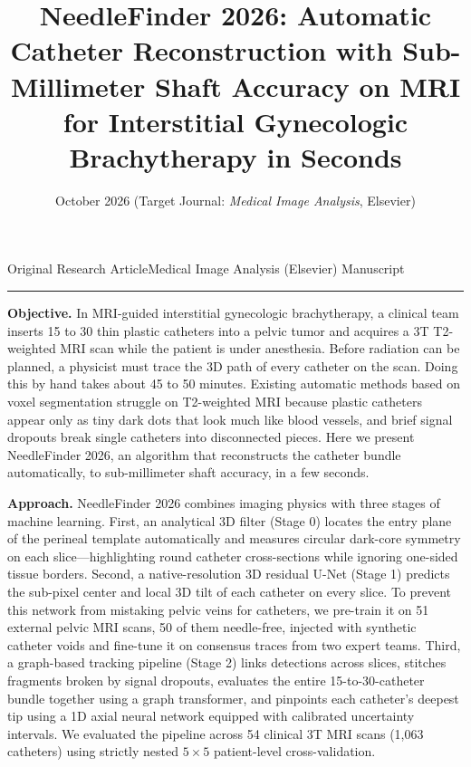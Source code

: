 \documentclass[
  11pt,
]{article}
\title{NeedleFinder 2026: Automatic Catheter Reconstruction with
Sub-Millimeter Shaft Accuracy on MRI for Interstitial Gynecologic
Brachytherapy in Seconds}
\author{}
\date{October 2026 (Target Journal: \emph{Medical Image Analysis},
Elsevier)}
\makeatletter
\newcommand{\nfcaps}[1]{{\nfcapsfont #1}}
\renewcommand{\maketitle}{%
  \thispagestyle{plain}%
  \begingroup
  \def\and{ }%
  \null\vspace*{-1.5\baselineskip}%
  {\raggedright
   {\nfcaps{\footnotesize Original Research Article}\hfill\nfcaps{\footnotesize Medical Image Analysis (Elsevier) \textperiodcentered{} Manuscript}\par}%
   \vspace{0.35\baselineskip}%
   {\color{nfrule}\rule{\linewidth}{0.4pt}\par}%
   \vspace{2.2\baselineskip}%
   {\fontsize{21}{25.5}\selectfont\@title\par}%
   \ifx\@author\@empty\else
     \vspace{1.4\baselineskip}%
     {\large\@author\par}%
   \fi
   \vspace{0.8\baselineskip}%
   {\small\itshape\color{nfgrey}\@date\par}%
  }%
  \vspace{2.2\baselineskip}%
  \endgroup}
\renewenvironment{abstract}
  {\par\noindent{\small\nfcaps{Abstract}}\par\vspace{0.4\baselineskip}%
   \begingroup\small\setlength{\parindent}{0pt}\setlength{\parskip}{0.45\baselineskip}}
  {\par\endgroup
   \vspace{0.9\baselineskip}%
   \noindent{\color{nfrule}\rule{\linewidth}{0.4pt}}\par\vspace{0.4\baselineskip}}
\makeatother
\begin{document}
\maketitle
\begin{abstract}
\textbf{Objective.} In MRI-guided interstitial gynecologic
brachytherapy, a clinical team inserts 15 to 30 thin plastic catheters
into a pelvic tumor and acquires a 3T T2-weighted MRI scan while the
patient is under anesthesia. Before radiation can be planned, a
physicist must trace the 3D path of every catheter on the scan. Doing
this by hand takes about 45 to 50 minutes. Existing automatic methods
based on voxel segmentation struggle on T2-weighted MRI because plastic
catheters appear only as tiny dark dots that look much like blood
vessels, and brief signal dropouts break single catheters into
disconnected pieces. Here we present NeedleFinder 2026, an algorithm
that reconstructs the catheter bundle automatically, to sub-millimeter
shaft accuracy, in a few seconds.

\textbf{Approach.} NeedleFinder 2026 combines imaging physics with three
stages of machine learning. First, an analytical 3D filter (Stage 0)
locates the entry plane of the perineal template automatically and
measures circular dark-core symmetry on each slice---highlighting round
catheter cross-sections while ignoring one-sided tissue borders. Second,
a native-resolution 3D residual U-Net (Stage 1) predicts the sub-pixel
center and local 3D tilt of each catheter on every slice. To prevent
this network from mistaking pelvic veins for catheters, we pre-train it
on 51 external pelvic MRI scans, 50 of them needle-free, injected with
synthetic catheter voids and fine-tune it on consensus traces from two
expert teams. Third, a graph-based tracking pipeline (Stage 2) links
detections across slices, stitches fragments broken by signal dropouts,
evaluates the entire 15-to-30-catheter bundle together using a graph
transformer, and pinpoints each catheter's deepest tip using a 1D axial
neural network equipped with calibrated uncertainty intervals. We
evaluated the pipeline across 54 clinical 3T MRI scans (1,063 catheters)
using strictly nested \(5 \times 5\) patient-level cross-validation.


\end{abstract}
\end{document}
